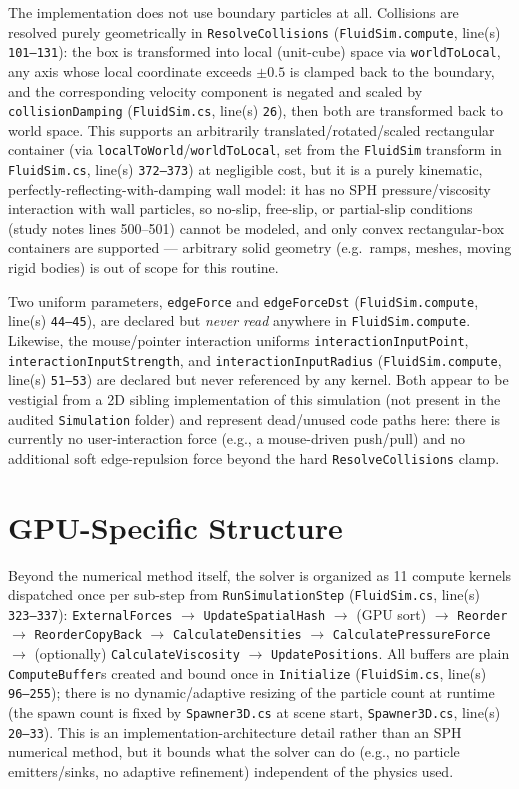 \documentclass[11pt]{article}
\newcommand{\file}[1]{\texttt{#1}}
\newcommand{\loc}[2]{\texttt{#1}, line(s) \texttt{#2}}
\begin{document}
The implementation does not use boundary particles at all. Collisions are
resolved purely geometrically in \texttt{ResolveCollisions}
(\loc{FluidSim.compute}{101--131}): the box is transformed into local
(unit-cube) space via \texttt{worldToLocal}, any axis whose local coordinate
exceeds $\pm0.5$ is clamped back to the boundary, and the corresponding
velocity component is negated and scaled by \texttt{collisionDamping}
(\loc{FluidSim.cs}{26}), then both are transformed back to world space. This
supports an arbitrarily translated/rotated/scaled rectangular container (via
\texttt{localToWorld}/\texttt{worldToLocal}, set from the \texttt{FluidSim}
transform in \loc{FluidSim.cs}{372--373}) at negligible cost, but it is a
purely kinematic, perfectly-reflecting-with-damping wall model: it has no
SPH pressure/viscosity interaction with wall particles, so no-slip,
free-slip, or partial-slip conditions (study notes lines 500--501) cannot be
modeled, and only convex rectangular-box containers are supported ---
arbitrary solid geometry (e.g.\ ramps, meshes, moving rigid bodies) is out of
scope for this routine.

Two uniform parameters, \texttt{edgeForce} and \texttt{edgeForceDst}
(\loc{FluidSim.compute}{44--45}), are declared but \emph{never read} anywhere
in \file{FluidSim.compute}. Likewise, the mouse/pointer interaction uniforms
\texttt{interactionInputPoint}, \texttt{interactionInputStrength}, and
\texttt{interactionInputRadius} (\loc{FluidSim.compute}{51--53}) are declared
but never referenced by any kernel. Both appear to be vestigial from a 2D
sibling implementation of this simulation (not present in the audited
\texttt{Simulation} folder) and represent dead/unused code paths here: there
is currently no user-interaction force (e.g., a mouse-driven push/pull) and
no additional soft edge-repulsion force beyond the hard
\texttt{ResolveCollisions} clamp.

\section{GPU-Specific Structure}

Beyond the numerical method itself, the solver is organized as 11 compute
kernels dispatched once per sub-step from \texttt{RunSimulationStep}
(\loc{FluidSim.cs}{323--337}):
\texttt{ExternalForces} $\to$ \texttt{UpdateSpatialHash} $\to$ (GPU sort)
$\to$ \texttt{Reorder} $\to$ \texttt{ReorderCopyBack} $\to$
\texttt{CalculateDensities} $\to$ \texttt{CalculatePressureForce} $\to$
(optionally) \texttt{CalculateViscosity} $\to$ \texttt{UpdatePositions}.
All buffers are plain \texttt{ComputeBuffer}s created and bound once in
\texttt{Initialize} (\loc{FluidSim.cs}{96--255}); there is no
dynamic/adaptive resizing of the particle count at runtime (the spawn count
is fixed by \file{Spawner3D.cs} at scene start, \loc{Spawner3D.cs}{20--33}).
This is an implementation-architecture detail rather than an SPH numerical
method, but it bounds what the solver can do (e.g., no particle
emitters/sinks, no adaptive refinement) independent of the physics used.
\end{document}
